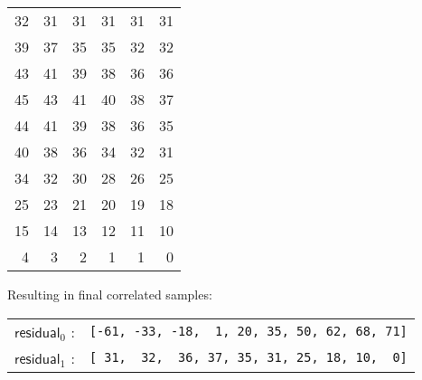 {{\begin{tabular}{|r|r|r|r|r|r|}
    \hline
    32 & 31 & 31 & 31 & 31 & 31 \\
    39 & 37 & 35 & 35 & 32 & 32 \\
    43 & 41 & 39 & 38 & 36 & 36 \\
    45 & 43 & 41 & 40 & 38 & 37 \\
    44 & 41 & 39 & 38 & 36 & 35 \\
    40 & 38 & 36 & 34 & 32 & 31 \\
    34 & 32 & 30 & 28 & 26 & 25 \\
    25 & 23 & 21 & 20 & 19 & 18 \\
    15 & 14 & 13 & 12 & 11 & 10 \\
    4 & 3 & 2 & 1 & 1 & 0 \\
    \hline
  \end{tabular}
}
\par
\noindent
Resulting in final correlated samples:
\newline
\begin{tabular}{rr}
$\textsf{residual}_0$ : & \texttt{[-61,~-33,~-18,~~1,~20,~35,~50,~62,~68,~71]} \\
$\textsf{residual}_1$ : & \texttt{[~31,~~32,~~36,~37,~35,~31,~25,~18,~10,~~0]} \\
\end{tabular}

\clearpage

}
